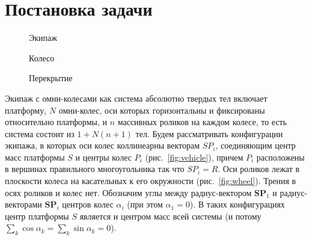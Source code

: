
\section{Постановка задачи}

\begin{figure}[h]
        \centering
        \caption{Экипаж}
        \label{fig:vehicle}
    \endminipage
        \centering
        \caption{Колесо}
        \label{fig:wheel}
    \endminipage
        \centering
        \caption{Перекрытие}
        \label{fig:overlap}
    \endminipage
\end{figure}

Экипаж с омни-колесами как система абсолютно твердых тел включает платформу, $N$ омни-колес, оси которых горизонтальны и фиксированы относительно платформы, и $n$ массивных роликов на каждом колесе, то есть система состоит из $1 + N(n+1)$ тел. Будем рассматривать конфигурации экипажа, в которых оси колес коллинеарны векторам $SP_i$, соединяющим центр масс платформы $S$ и центры колес $P_i$ (рис.~\ref{fig:vehicle}), причем $P_i$ расположены в вершинах правильного многоугольника так что $SP_i = R$. Оси роликов лежат в плоскости колеса на касательных к его окружности (рис.~\ref{fig:wheel}). Трения в осях роликов и колес нет.
Обозначим углы между радиус-вектором $\mathbf{SP}_1$ и радиус-векторами $\mathbf{SP}_i$ центров колес $\alpha_i$ (при этом $\alpha_1 = 0$).
В таких конфигурациях центр платформы $S$ является и центром масс всей системы (и потому $\sum\limits_{k} \cos\alpha_k = \sum\limits_{k}\sin\alpha_k = 0$).

